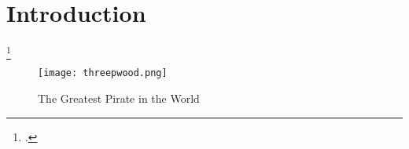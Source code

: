 
\section{Introduction}

\blindtext[2]
\footcite[]{smith2010wealth}

\begin{wrapfigure}{l}{0.4\textwidth}
  \centering
  \texttt{[image: threepwood.png]}
  \caption{The Greatest Pirate in the World}\label{fig:threepwood}
\end{wrapfigure}

\blindtext[2]
